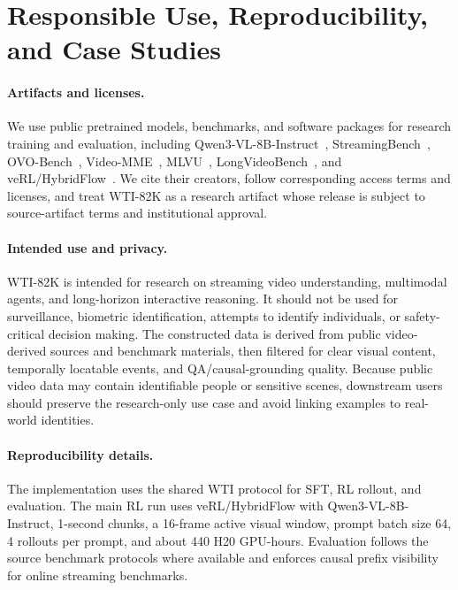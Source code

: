 \section{Responsible Use, Reproducibility, and Case Studies}
\label{app:responsible_use}

\paragraph{Artifacts and licenses.}
We use public pretrained models, benchmarks, and software packages for research training and evaluation, including Qwen3-VL-8B-Instruct~\citep{qwen3vl2025}, StreamingBench~\citep{streamingbench2024}, OVO-Bench~\citep{ovobench2025}, Video-MME~\citep{videomme2025}, MLVU~\citep{mlvu2024}, LongVideoBench~\citep{longvideobench2024}, and veRL/HybridFlow~\citep{sheng2024hybridflow}.
We cite their creators, follow corresponding access terms and licenses, and treat WTI-82K as a research artifact whose release is subject to source-artifact terms and institutional approval.

\paragraph{Intended use and privacy.}
WTI-82K is intended for research on streaming video understanding, multimodal agents, and long-horizon interactive reasoning.
It should not be used for surveillance, biometric identification, attempts to identify individuals, or safety-critical decision making.
The constructed data is derived from public video-derived sources and benchmark materials, then filtered for clear visual content, temporally locatable events, and QA/causal-grounding quality.
Because public video data may contain identifiable people or sensitive scenes, downstream users should preserve the research-only use case and avoid linking examples to real-world identities.

\paragraph{Reproducibility details.}
The implementation uses the shared WTI protocol for SFT, RL rollout, and evaluation.
The main RL run uses veRL/HybridFlow with Qwen3-VL-8B-Instruct, 1-second chunks, a 16-frame active visual window, prompt batch size 64, 4 rollouts per prompt, and about 440 H20 GPU-hours.
Evaluation follows the source benchmark protocols where available and enforces causal prefix visibility for online streaming benchmarks.

